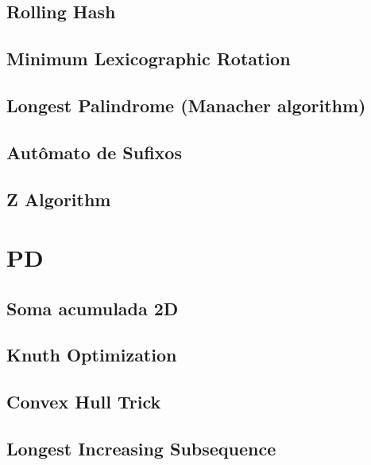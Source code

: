 \subsection{Rolling Hash}
\raggedbottom
\hrulefill
\subsection{Minimum Lexicographic Rotation}
\raggedbottom
\hrulefill
\subsection{Longest Palindrome (Manacher algorithm)}
\raggedbottom
\hrulefill
\subsection{Autômato de Sufixos}
\raggedbottom
\hrulefill
\subsection{Z Algorithm}
\raggedbottom
\hrulefill

\section{PD}
\subsection{Soma acumulada 2D}
\raggedbottom
\hrulefill
\subsection{Knuth Optimization}
\raggedbottom
\hrulefill
\subsection{Convex Hull Trick}
\raggedbottom
\hrulefill
\subsection{Longest Increasing Subsequence}
\raggedbottom
\hrulefill
